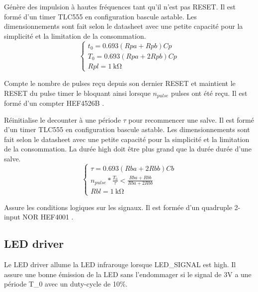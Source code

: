\documentclass[french]{layout/Report}
\begin{document}
\begin{description}[leftmargin=!,labelwidth=3cm, labelindent=\parindent]
	\item[Pulse timer] Génère des impulsion à hautes fréquences tant qu'il n'est pas RESET. Il est formé d'un timer TLC555 en configuration bascule astable. Les dimensionnements sont fait selon le datasheet \cite{TLC555} avec une petite capacité pour la simplicité et la limitation de la consommation.
		\begin{equation*}
			\begin{cases}
				t_0 = 0.693(Rpa+Rpb)Cp \\
				T_0 = 0.693(Rpa+2Rpb)Cp \\
				Rpl	= \SI{1}{\kilo\ohm}
			\end{cases}
		\end{equation*}
	\item[Decounter] Compte le nombre de pulses reçu depuis son dernier RESET et maintient le RESET du pulse timer le bloquant ainsi lorsque $n_{pulse}$ pulses ont été reçu. Il est formé d'un compter HEF4526B \cite{HEF4526B}.
	\item[Burst timer] Réinitialise le decounter à une période $\tau$ pour recommencer une salve. Il est formé d'un timer TLC555 en configuration bascule astable. Les dimensionnements sont fait selon le datasheet \cite{TLC555} avec une petite capacité pour la simplicité et la limitation de la consommation. La durée high doit être plus grand que la durée durée d'une salve.
		\begin{equation*}
			\begin{cases}
				\tau = 0.693(Rba+2Rbb)Cb \\
				n_{pulse}*\frac{T_0}{\tau} < \frac{Rba+Rbb}{Rba+2Rbb} \\
				Rbl	= \SI{1}{\kilo\ohm}
			\end{cases}
		\end{equation*}
	\item[Logic] Assure les conditions logiques sur les signaux. Il est formée d'un quadruple 2-input NOR HEF4001 \cite{HEF4001B}.
\end{description}

\subsection{LED driver}
\label{subsec:LED_driver}
Le LED driver allume la LED infrarouge lorsque LED\_SIGNAL est high. Il assure une bonne émission de la LED sans l'endommager si le signal de 3V a une période T\_0 avec un duty-cycle de 10\%.
\end{document}
